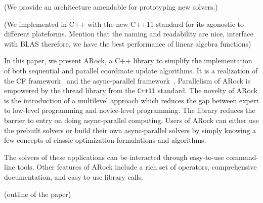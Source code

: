 (We provide an architecture amendable for prototyping new solvers.)

(We implemented in C++ with the new C++11 standard for its agonostic to different plateforms. Mention that the naming and readability are nice, interface with BLAS therefore, we have the best performance of linear algebra functions) 

In this paper, we present ARock, a C++ library to simplify the implementation of both sequential and parallel coordinate update algorithms. It is a realization of the CF framework~\citep{peng2016coordinate} and the async-parallel framework~\citep{peng2015arock}. Parallelism of ARock is empowered by the thread library from the \texttt{C++11} standard. The novelty of ARock is the introduction of a multilevel approach which reduces the gap between expert to low-level programming and novice-level programming.
The library reduces the barrier to entry on doing async-parallel computing. 
Users of ARock can either use the prebuilt solvers or build their own async-parallel solvers by simply knowing a few concepts of classic optimization formulations and algorithms.

 
The solvers of these applications can be interacted through easy-to-use command-line tools. 
Other features of ARock include a rich set of operators, comprehensive documentation, and easy-to-use library calls.



(outline of the paper)
